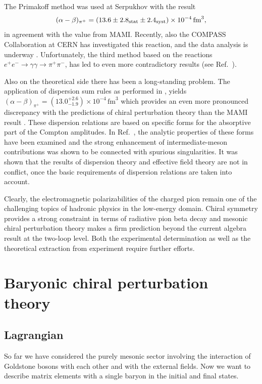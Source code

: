 \documentclass[twoside,12pt]{article}
\begin{document}
   The Primakoff method was used at Serpukhov with the result~\cite{Antipov:1982kz}
\begin{equation}
(\alpha - \beta)_{\pi^+} = (13.6 \pm 2.8_{\rm{stat}} \pm
2.4_{\rm{syst}}) \times 10^{-4}\, \mbox{fm}^3, \label{eq:_1.4}
\end{equation}
in agreement with the value from MAMI.
   Recently, also the COMPASS Collaboration
at CERN has investigated this reaction, and the data analysis is
underway \cite{Guskov:2008zz}.
   Unfortunately, the third method based on the
reactions $e^+e^- \rightarrow \gamma \gamma \rightarrow \pi^+\pi^-$, has led to
even more contradictory results (see Ref.~\cite{Gasser:2006qa}).

   Also on the theoretical side there has been a long-standing problem.
   The application of dispersion sum rules as performed in
\cite{Fil'kov:1998np}, \cite{Fil'kov:2005ss} yields $(\alpha-\beta)_{\pi^+}=(13.0^{+2.6}_{-1.9}) \times
10^{-4}\, \mbox{fm}^3$ which provides an even more pronounced discrepancy with the predictions
of chiral perturbation theory than the MAMI result \cite{Gasser:2006qa}.
   These dispersion relations are based on specific forms for the absorptive part
of the Compton amplitudes.
   In Ref.\ \cite{Pasquini:2008ep}, the analytic properties of these forms have been examined
and the strong enhancement of intermediate-meson contributions was shown to be
connected with spurious singularities.
   It was shown that the results of dispersion theory and effective field theory are
not in conflict, once the basic requirements of dispersion relations
are taken into account.

   Clearly, the electromagnetic polarizabilities of the charged pion remain one of
the challenging topics of hadronic physics in the low-energy domain.
   Chiral symmetry provides a strong constraint in terms of radiative pion beta
decay and mesonic chiral perturbation theory makes a firm prediction beyond the
current algebra result at the two-loop level.
   Both the experimental determination as well as the theoretical extraction from
experiment require further efforts.

\section{Baryonic chiral perturbation theory}
\label{section_bchpt}
\subsection{Lagrangian}
   So far we have considered the purely mesonic sector involving the interaction of Goldstone
bosons with each other and with the external fields.
   Now we want to describe matrix elements with a single baryon in the initial and
final states.
\end{document}
